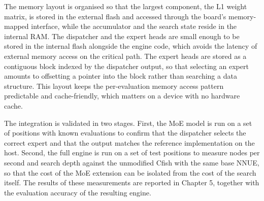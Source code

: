 The memory layout is organised so that the largest component, the L1 weight matrix, is stored in the external flash and accessed through the board's memory-mapped interface, while the accumulator and the search state reside in the internal RAM. The dispatcher and the expert heads are small enough to be stored in the internal flash alongside the engine code, which avoids the latency of external memory access on the critical path. The expert heads are stored as a contiguous block indexed by the dispatcher output, so that selecting an expert amounts to offsetting a pointer into the block rather than searching a data structure. This layout keeps the per-evaluation memory access pattern predictable and cache-friendly, which matters on a device with no hardware cache.


The integration is validated in two stages. First, the MoE model is run on a set of positions with known evaluations to confirm that the dispatcher selects the correct expert and that the output matches the reference implementation on the host. Second, the full engine is run on a set of test positions to measure nodes per second and search depth against the unmodified Cfish with the same base NNUE, so that the cost of the MoE extension can be isolated from the cost of the search itself. The results of these measurements are reported in Chapter 5, together with the evaluation accuracy of the resulting engine.




